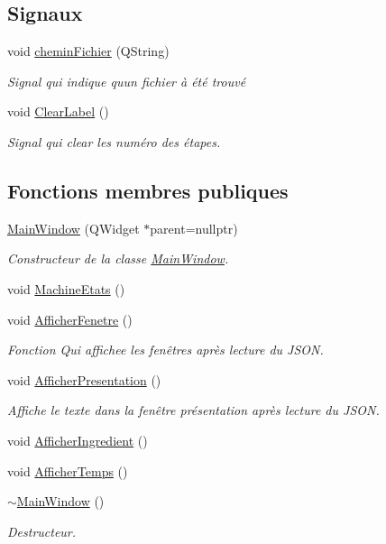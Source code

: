 \subsection*{Signaux}
\begin{DoxyCompactItemize}
\item 
void \hyperlink{class_main_window_a397116dafcb548fec351091cc025b822}{chemin\+Fichier} (Q\+String)
\begin{DoxyCompactList}\small\item\em Signal qui indique qu\textquotesingle{}un fichier à été trouvé \end{DoxyCompactList}\item 
void \hyperlink{class_main_window_a9a0c33e6e696ffc763560205f992650d}{Clear\+Label} ()
\begin{DoxyCompactList}\small\item\em Signal qui clear les numéro des étapes. \end{DoxyCompactList}\end{DoxyCompactItemize}
\subsection*{Fonctions membres publiques}
\begin{DoxyCompactItemize}
\item 
\hyperlink{class_main_window_a996c5a2b6f77944776856f08ec30858d}{Main\+Window} (Q\+Widget $\ast$parent=nullptr)
\begin{DoxyCompactList}\small\item\em Constructeur de la classe \hyperlink{class_main_window}{Main\+Window}. \end{DoxyCompactList}\item 
void \hyperlink{class_main_window_a59cd9a83e43405ae1ad5c18e79b04db5}{Machine\+Etats} ()
\item 
void \hyperlink{class_main_window_a7f4b9726171670ec8d85bb6b09e0665d}{Afficher\+Fenetre} ()
\begin{DoxyCompactList}\small\item\em Fonction Qui affichee les fenêtres après lecture du J\+S\+ON. \end{DoxyCompactList}\item 
void \hyperlink{class_main_window_a9bf06dfcc398454facb39e71ebf32550}{Afficher\+Presentation} ()
\begin{DoxyCompactList}\small\item\em Affiche le texte dans la fenêtre présentation après lecture du J\+S\+ON. \end{DoxyCompactList}\item 
void \hyperlink{class_main_window_ad4059abf16eb904f988371b3791002bf}{Afficher\+Ingredient} ()
\item 
void \hyperlink{class_main_window_a33811a52abf8f1ce71ec4e150d9c9ac8}{Afficher\+Temps} ()
\item 
\hyperlink{class_main_window_ae98d00a93bc118200eeef9f9bba1dba7}{$\sim$\+Main\+Window} ()
\begin{DoxyCompactList}\small\item\em Destructeur. \end{DoxyCompactList}\end{DoxyCompactItemize}
